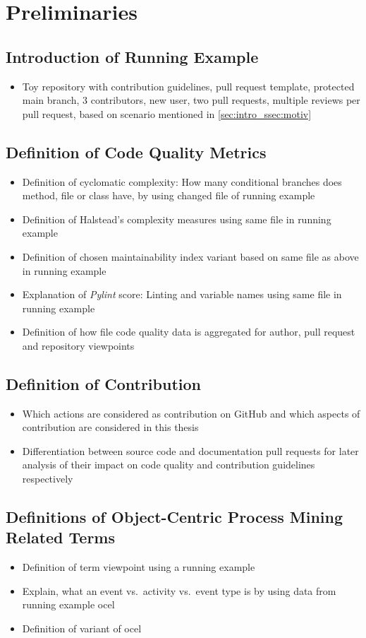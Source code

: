 \chapter{Preliminaries}
\label{chap:prelim}

\section{Introduction of Running Example}
\begin{itemize}
	\item Toy repository with contribution guidelines, pull request template, protected main branch, 3 contributors, new user, two pull requests, multiple reviews per pull request, based on scenario mentioned in \autoref{sec:intro_ssec:motiv}
\end{itemize}

\section{Definition of Code Quality Metrics}
\begin{itemize}
	\item Definition of cyclomatic complexity: How many conditional branches does method, file or class have, by using changed file of running example
	\item Definition of Halstead's complexity measures using same file in running example
	\item Definition of chosen maintainability index variant based on same file as above in running example
	\item Explanation of \emph{Pylint} score: Linting and variable names using same file in running example
	\item Definition of how file code quality data is aggregated for author, pull request and repository viewpoints
\end{itemize}

\section{Definition of Contribution}
\begin{itemize}
	\item Which actions are considered as contribution on GitHub and which aspects of contribution are considered in this thesis
	\item Differentiation between source code and documentation pull requests for later analysis of their impact on code quality and contribution guidelines respectively
\end{itemize}

\section{Definitions of Object-Centric Process Mining Related Terms}
\begin{itemize}
	\item Definition of term viewpoint using a running example
	\item Explain, what an event vs.\ activity vs.\ event type is by using data from running example \ac{ocel}
	\item Definition of variant of \ac{ocel}
\end{itemize}